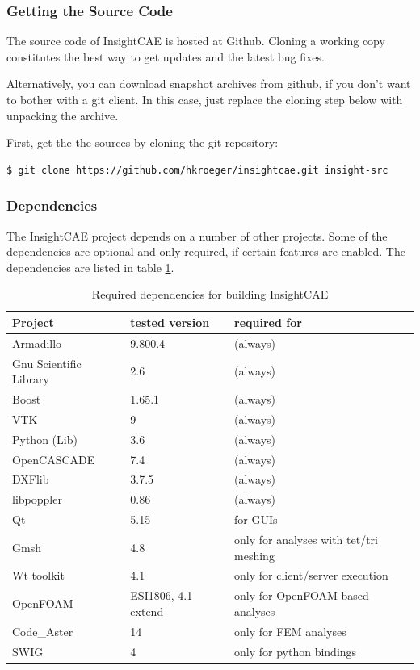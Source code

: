 \subsubsection{Getting the Source Code}

The source code of InsightCAE is hosted at Github. 
Cloning a working copy constitutes the best way to get updates and the latest bug fixes.

Alternatively, you can download snapshot archives from github, if you don't want to bother with a git client.
In this case, just replace the cloning step below with unpacking the archive.

First, get the the sources by cloning the git repository:
\begin{lstlisting}[language=bash]
$ git clone https://github.com/hkroeger/insightcae.git insight-src
\end{lstlisting}


\subsubsection{Dependencies}

The InsightCAE project depends on a number of other projects.
Some of the dependencies are optional and only required, if certain features are enabled.
The dependencies are listed in table \ref{tab:dependencies}.

\begin{table}[h!]
\centering
\begin{tabular}{lll}
\hline
Project & tested version & required for\\
\hline

Armadillo & 9.800.4 & (always)\\
Gnu Scientific Library & 2.6 & (always)\\
Boost & 1.65.1 &(always) \\
VTK & 9 & (always)\\
Python (Lib) & 3.6 & (always)\\
OpenCASCADE & 7.4 & (always)\\
DXFlib & 3.7.5 & (always)\\
libpoppler & 0.86 & (always) \\
Qt & 5.15 & for GUIs\\
Gmsh & 4.8 & only for analyses with tet/tri meshing\\
Wt toolkit & 4.1 & only for client/server execution\\
OpenFOAM & ESI1806, 4.1 extend & only for OpenFOAM based analyses\\
Code\_Aster & 14 & only for FEM analyses \\
SWIG & 4 & only for python bindings \\
\hline
\end{tabular}
\caption{Required dependencies for building InsightCAE}
\label{tab:dependencies}
\end{table}

